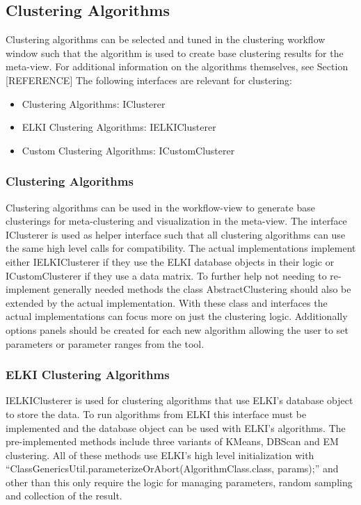 \documentclass[
	a4paper,
	english,
	twoside,
	openright,               
	11pt                            
	]{report}
\begin{document}
\subsection{Clustering Algorithms}
Clustering algorithms can be selected and tuned in the clustering workflow window such that the algorithm is used to create base clustering results for the meta-view. For additional information on the algorithms themselves, see Section [REFERENCE] The following interfaces are relevant for clustering:

\begin{itemize}
  \item Clustering Algorithms: IClusterer
  \item ELKI Clustering Algorithms: IELKIClusterer
  \item Custom Clustering Algorithms: ICustomClusterer
\end{itemize}

\subsubsection{Clustering Algorithms}
Clustering algorithms can be used in the workflow-view to generate base clusterings for meta-clustering and visualization in the meta-view. The interface IClusterer is used as helper interface such that all clustering algorithms can use the same high level calls for compatibility. The actual implementations implement either IELKIClusterer if they use the ELKI database objects in their logic or ICustomClusterer if they use a data matrix. To further help not needing to re-implement generally needed methods the class AbstractClustering should also be extended by the actual implementation. With these class and interfaces the actual implementations can focus more on just the clustering logic. Additionally options panels should be created for each new algorithm allowing the user to set parameters or parameter ranges from the tool.

\subsubsection{ELKI Clustering Algorithms}
IELKIClusterer is used for clustering algorithms that use ELKI's database object to store the data. To run algorithms from ELKI this interface must be implemented and the database object can be used with ELKI's algorithms. The pre-implemented methods include three variants of KMeans, DBScan and EM clustering. All of these methods use ELKI's high level initialization with ``ClassGenericsUtil.parameterizeOrAbort(AlgorithmClass.class, params);'' and other than this only require the logic for managing parameters, random sampling and collection of the result.
\end{document}

